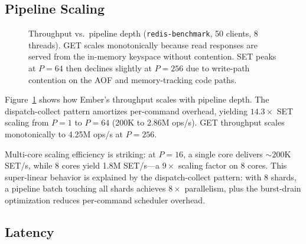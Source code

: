 \documentclass[conference]{IEEEtran}
\begin{document}
\subsection{Pipeline Scaling}

\begin{figure}[t]
\centering
{}
\caption{Throughput vs.\ pipeline depth (\texttt{redis-benchmark},
50 clients, 8 threads). GET scales monotonically because read
responses are served from the in-memory keyspace without contention.
SET peaks at $P{=}64$ then declines slightly at $P{=}256$ due to
write-path contention on the AOF and memory-tracking code paths.}
\label{fig:pipeline}
\end{figure}

Figure~\ref{fig:pipeline} shows how Ember's throughput scales with
pipeline depth. The dispatch-collect pattern amortizes per-command
overhead, yielding $14.3\times$ SET scaling from $P{=}1$ to $P{=}64$
(200K to 2.86M ops/s). GET throughput scales monotonically to
4.25M ops/s at $P{=}256$.

Multi-core scaling efficiency is striking: at $P{=}16$, a single
core delivers ${\sim}200$K SET/s, while 8 cores yield 1.8M SET/s---a
$9\times$ scaling factor on 8 cores. This super-linear behavior is
explained by the dispatch-collect pattern: with 8 shards, a pipeline
batch touching all shards achieves $8\times$ parallelism, plus the
burst-drain optimization reduces per-command scheduler overhead.


\subsection{Latency}
\end{document}
